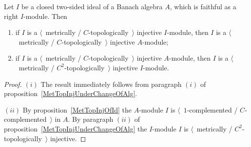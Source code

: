 \begin{proposition}\label{ReduceInjIdToInjAlg} Let $I$ be a closed two-sided ideal of
a Banach algebra $A$, which is faithful as a right $I$-module. Then

\begin{enumerate}[label = (\roman*)]
    \item if $I$ is a $\langle$~metrically / $C$-topologically~$\rangle$ injective
    $I$-module, then $I$ is a $\langle$~metrically / $C$-topologically~$\rangle$
    injective $A$-module; 

    \item if $I$ is a $\langle$~metrically / $C$-topologically~$\rangle$ injective
    $A$-module, then $I$ is a $\langle$~metrically / $C^2$-topologically~$\rangle$
    injective $I$-module.
\end{enumerate}
\end{proposition}
\begin{proof} $(i)$ The result immediately follows from paragraph $(i)$ of
proposition~\ref{MetTopInjUnderChangeOfAlg}.

$(ii)$ By proposition~\ref{MetTopInjOfId} the $A$-module $I$ is
$\langle$~$1$-complemented / $C$-complemented~$\rangle$ in $A$. By paragraph
$(ii)$ of proposition~\ref{MetTopInjUnderChangeOfAlg} the $I$-module $I$ is
$\langle$~metrically / $C^2$-topologically~$\rangle$ injective.
\end{proof}
